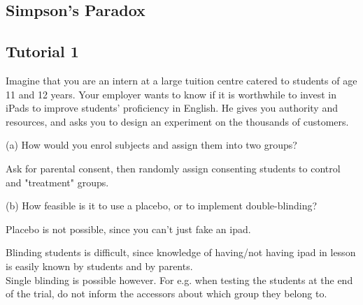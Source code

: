 \documentclass{article}
\begin{document}
\subsection{Simpson's Paradox}


\subsection{Tutorial 1}
Imagine	that	you	are	an intern	at	a	large	tuition	centre catered	to	students	of	age	11	and	12	
years. Your	 employer	 wants to	 know	 if	 it	 is	 worthwhile	 to	 invest	 in iPads to improve students’	proficiency	in English.	He gives	you	authority	and	resources,	and asks	you	
to design	an	experiment	on	the	thousands	of	customers.

(a)	How	would	you	enrol	subjects	and	assign	them	into	two	groups?

Ask for parental consent, then randomly assign consenting students to control and "treatment" groups.


(b)	How	feasible is	it	to	use	a placebo, or to implement double-blinding?

Placebo is not possible, since you can't just fake an ipad.

Blinding students is difficult, since knowledge of having/not having ipad in lesson is easily known by students and by parents.\\
Single blinding is possible however. For e.g. when testing the students at the end of the trial, do not inform the accessors about which group they belong to.
\end{document}
